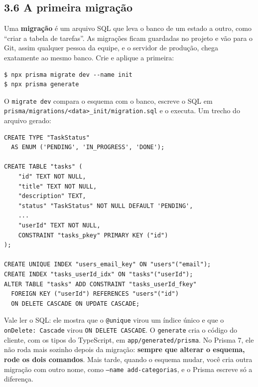 \subsection{3.6 A primeira migração}

Uma \textbf{migração} é um arquivo SQL que leva o banco de um estado a outro, como ``criar a tabela de tarefas''. As migrações ficam guardadas no projeto e vão para o Git, assim qualquer pessoa da equipe, e o servidor de produção, chega exatamente ao mesmo banco. Crie e aplique a primeira:

\begin{codigo}
\begin{Verbatim}[breaklines=true, breaksymbolleft={}, fontsize=\footnotesize]
$ npx prisma migrate dev --name init
$ npx prisma generate
\end{Verbatim}
\end{codigo}

O \texttt{migrate dev} compara o esquema com o banco, escreve o SQL em \texttt{prisma/migrations/<data>\_init/migration.sql} e o executa. Um trecho do arquivo gerado:

\begin{codigo}
\begin{Verbatim}[breaklines=true, breaksymbolleft={}, fontsize=\footnotesize]
CREATE TYPE "TaskStatus"
  AS ENUM ('PENDING', 'IN_PROGRESS', 'DONE');

CREATE TABLE "tasks" (
    "id" TEXT NOT NULL,
    "title" TEXT NOT NULL,
    "description" TEXT,
    "status" "TaskStatus" NOT NULL DEFAULT 'PENDING',
    ...
    "userId" TEXT NOT NULL,
    CONSTRAINT "tasks_pkey" PRIMARY KEY ("id")
);

CREATE UNIQUE INDEX "users_email_key" ON "users"("email");
CREATE INDEX "tasks_userId_idx" ON "tasks"("userId");
ALTER TABLE "tasks" ADD CONSTRAINT "tasks_userId_fkey"
  FOREIGN KEY ("userId") REFERENCES "users"("id")
  ON DELETE CASCADE ON UPDATE CASCADE;
\end{Verbatim}
\end{codigo}

Vale ler o SQL: ele mostra que o \texttt{@unique} virou um índice único e que o \texttt{onDelete: Cascade} virou \texttt{ON DELETE CASCADE}. O \texttt{generate} cria o código do cliente, com os tipos do TypeScript, em \texttt{app/generated/prisma}. No Prisma 7, ele não roda mais sozinho depois da migração: \textbf{sempre que alterar o esquema, rode os dois comandos}. Mais tarde, quando o esquema mudar, você cria outra migração com outro nome, como \texttt{--name add-categorias}, e o Prisma escreve só a diferença.

